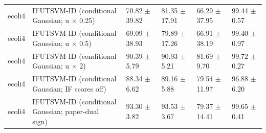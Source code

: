 \begin{table}[!t]
{\begin{tabular}{llllll}
ecoli4 & \shortstack[l]{IFUTSVM-ID (conditional\\Gaussian; u \(\times\) 0.25)} & 70.82 \(\pm\) 39.82 & 81.35 \(\pm\) 17.91 & 66.29 \(\pm\) 37.95 & 99.44 \(\pm\) 0.57 \\
ecoli4 & \shortstack[l]{IFUTSVM-ID (conditional\\Gaussian; u \(\times\) 0.5)} & 69.09 \(\pm\) 38.93 & 79.89 \(\pm\) 17.26 & 66.91 \(\pm\) 38.19 & 99.40 \(\pm\) 0.97 \\
ecoli4 & \shortstack[l]{IFUTSVM-ID (conditional\\Gaussian; u \(\times\) 2)} & 90.39 \(\pm\) 5.79 & 90.93 \(\pm\) 5.21 & 81.69 \(\pm\) 9.70 & 99.72 \(\pm\) 0.27 \\
ecoli4 & \shortstack[l]{IFUTSVM-ID (conditional\\Gaussian; IF scores off)} & 88.34 \(\pm\) 6.62 & 89.16 \(\pm\) 5.88 & 79.54 \(\pm\) 11.97 & 96.88 \(\pm\) 6.20 \\
ecoli4 & \shortstack[l]{IFUTSVM-ID (conditional\\Gaussian; paper-dual\\sign)} & 93.30 \(\pm\) 3.82 & 93.53 \(\pm\) 3.67 & 79.37 \(\pm\) 14.41 & 99.65 \(\pm\) 0.41 \\
\hline
\end{tabular}%
}
\end{table}

